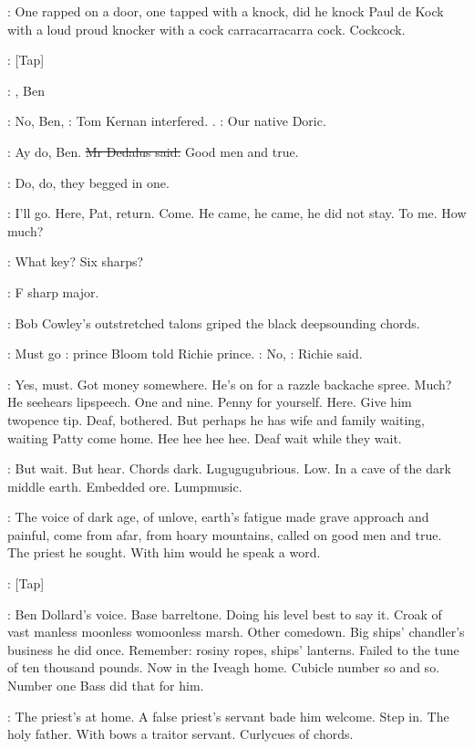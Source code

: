 \BloomInt:
One rapped on a door,
one tapped with a knock,
did he knock Paul
de Kock with a loud proud knocker with a cock carracarracarra cock.
Cockcock.

\stripling:
[Tap]

\cowley:
,
Ben

:
No,
Ben,
:
Tom Kernan interfered.
.
:
Our native Doric.

\simon:
Ay do,
Ben.
\sout{Mr Dedalus said.}
Good men and true.

:
Do,
do,
they begged in one.

\BloomInt:
I'll go.
Here,
Pat,
return.
Come.
He came,
he came,
he did not stay.
To me.
How much?

\cowley:
What key?
Six sharps?

\dollard:
F sharp major.

:
Bob Cowley's outstretched talons griped the
black deepsounding chords.

\BloomInt:
Must go
:
prince Bloom told Richie prince.
\goulding:
No,
:
Richie said.

\BloomInt:
Yes,
must.
Got money somewhere.
He's on for a razzle backache spree.
Much?
He
seehears lipspeech.
One and nine.
Penny for yourself.
Here.
Give him
twopence tip.
Deaf,
bothered.
But perhaps he has wife and family waiting,
waiting Patty come home.
Hee hee hee hee.
Deaf wait while they wait.

\BloomInt:
But wait.
But hear.
Chords dark.
Lugugugubrious.
Low.
In a cave of
the dark middle earth.
Embedded ore.
Lumpmusic.

:
The voice of dark age,
of unlove,
earth's fatigue made grave approach
and painful,
come from afar,
from hoary mountains,
called on good men
and true.
The priest he sought.
With him would he speak a word.

\stripling:
[Tap]

\BloomInt:
Ben Dollard's voice.
Base barreltone.
Doing his level best to say it.
Croak of vast manless moonless womoonless marsh.
Other comedown.
Big
ships' chandler's business he did once.
Remember:
rosiny ropes,
ships'
lanterns.
Failed to the tune of ten thousand pounds.
Now in the Iveagh
home.
Cubicle number so and so.
Number one Bass did that for him.

:
The priest's at home.
A false priest's servant bade him welcome.
Step
in.
The holy father.
With bows a traitor servant.
Curlycues of chords.

